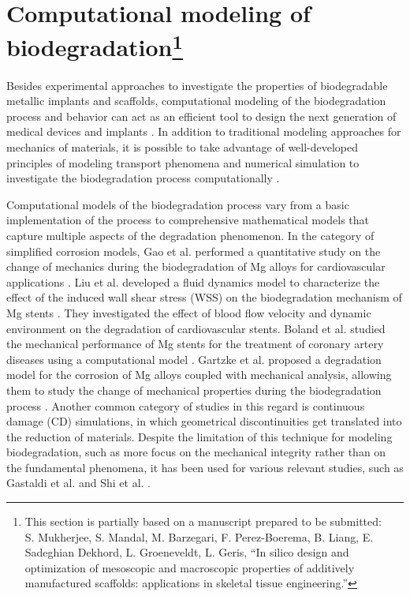 \section[Computational modeling of biodegradation]{Computational modeling of biodegradation\footnote{This section is partially based on a manuscript prepared to be submitted:\\S. Mukherjee, S. Mandal, M. Barzegari, F. Perez-Boerema, B. Liang, E. Sadeghian Dekhord, L. Groeneveldt, L. Geris, ``In silico design and optimization of mesoscopic and macroscopic properties of additively manufactured scaffolds: applications in skeletal tissue engineering.''}}


Besides experimental approaches to investigate the properties of biodegradable metallic implants and scaffolds, computational modeling of the biodegradation process and behavior can act as an efficient tool to design the next generation of medical devices and implants \cite{Boland2015}. In addition to traditional modeling approaches for mechanics of materials, it is possible to take advantage of well-developed principles of modeling transport phenomena and numerical simulation to investigate the biodegradation process computationally \cite{SanzHerrera2019}.


Computational models of the biodegradation process vary from a basic implementation of the process to comprehensive mathematical models that capture multiple aspects of the degradation phenomenon. In the category of simplified corrosion models, Gao et al. performed a quantitative study on the change of mechanics during the biodegradation of Mg alloys for cardiovascular applications \cite{Gao2018}. Liu et al. developed a fluid dynamics model to characterize the effect of the induced wall shear stress (\gls{WSS}) on the biodegradation mechanism of Mg stents \cite{Liu2018}. They investigated the effect of blood flow velocity and dynamic environment on the degradation of cardiovascular stents. Boland et al. studied the mechanical performance of Mg stents for the treatment of coronary artery diseases using a computational model \cite{Boland2019}. Gartzke et al. proposed a degradation model for the corrosion of Mg alloys coupled with mechanical analysis, allowing them to study the change of mechanical properties during the biodegradation process \cite{Gartzke2020}. Another common category of studies in this regard is continuous damage (\gls{CD}) simulations, in which geometrical discontinuities get translated into the reduction of materials. Despite the limitation of this technique for modeling biodegradation, such as more focus on the mechanical integrity rather than on the fundamental phenomena, it has been used for various relevant studies, such as Gastaldi et al. \cite{Gastaldi2011} and Shi et al. \cite{Shi2021}. 

